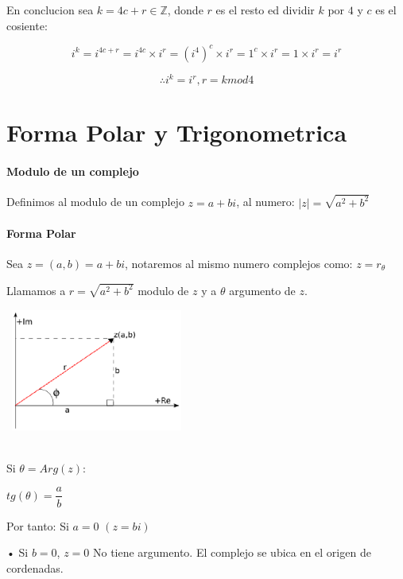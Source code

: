 En conclucion sea $k=4c+r \in \mathbb{Z}$, donde $r$ es el resto ed dividir $k$ por $4$ y $c$ es el cosiente:

$$i^k = i^{4c+r} = i^{4c} \times i^r = (i^4)^c \times i^r = 1^c \times i^r = 1 \times i^r = i^r$$

$$\therefore i^k=i^r , r = k mod 4$$



\section{Forma Polar y Trigonometrica}

\paragraph{Modulo de un complejo}

Definimos al modulo de un complejo $z=a+bi$, al numero: $|z|=\sqrt{a^2+b^2}$

\paragraph{Forma Polar}

\hfill
\begin{minipage}{.45\textwidth}
Sea $z=(a,b)=a+bi$, notaremos al mismo numero complejos como: $z= r_\theta$  

Llamamos a $r=\sqrt{a^2+b^2}$ modulo de $z$ y a $\theta$ argumento de $z$.
\end{minipage}
\hfill
\begin{minipage}{.45\textwidth}
\includegraphics[height=4cm,width=6cm]{complejo1.eps}
\end{minipage}
\hfill
\\

Si $\theta = Arg(z)$:

\quad$tg(\theta)=\dfrac{a}{b}$

Por tanto: Si $a=0$ \quad $(z=bi)$

\qquad\qquad • Si $b=0$, $z=0$ No tiene argumento. El complejo se ubica en el origen de cordenadas.\\

